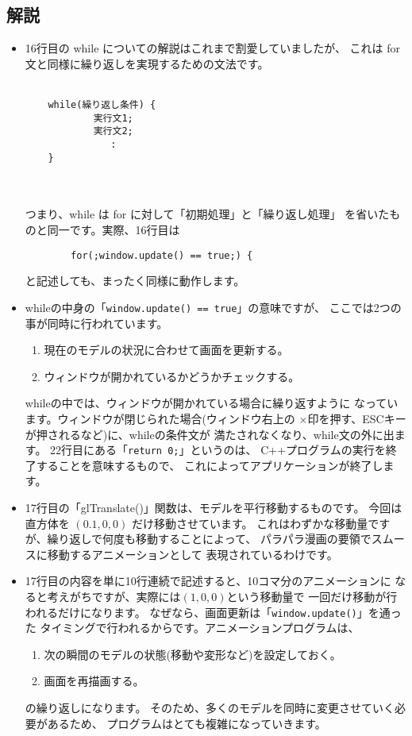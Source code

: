 \subsection*{解説}
\begin{itemize}
 \item 16行目の while についての解説はこれまで割愛していましたが、
	これは for 文と同様に繰り返しを実現するための文法です。\\ ~ \\
	\begin{shadebox}
	\begin{verbatim}
	while(繰り返し条件) {
	        実行文1;
	        実行文2;
	           :
	}
	\end{verbatim}
	\end{shadebox} \\ ~ \\
	つまり、while は for に対して「初期処理」と「繰り返し処理」
	を省いたものと同一です。実際、16行目は
	\begin{screen}
	\begin{verbatim}
	    for(;window.update() == true;) {
	\end{verbatim}
	\end{screen}
	と記述しても、まったく同様に動作します。

 \item whileの中身の「\verb+window.update() == true+」の意味ですが、
	ここでは2つの事が同時に行われています。
	\begin{enumerate}
	 \item 現在のモデルの状況に合わせて画面を更新する。
	 \item ウィンドウが開かれているかどうかチェックする。
	\end{enumerate}
	whileの中では、ウィンドウが開かれている場合に繰り返すように
	なっています。ウィンドウが閉じられた場合(ウィンドウ右上の
	×印を押す、ESCキーが押されるなど)に、whileの条件文が
	満たされなくなり、while文の外に出ます。
	22行目にある「\verb+return 0;+」というのは、
	C++プログラムの実行を終了することを意味するもので、
	これによってアプリケーションが終了します。

 \item 17行目の「glTranslate()」関数は、モデルを平行移動するものです。
	今回は直方体を \((0.1, 0, 0)\) だけ移動させています。
	これはわずかな移動量ですが、繰り返しで何度も移動することによって、
	パラパラ漫画の要領でスムースに移動するアニメーションとして
	表現されているわけです。

 \item 17行目の内容を単に10行連続で記述すると、10コマ分のアニメーションに
	なると考えがちですが、実際には\((1, 0, 0)\)という移動量で
	一回だけ移動が行われるだけになります。
	なぜなら、画面更新は「\verb+window.update()+」を通った
	タイミングで行われるからです。アニメーションプログラムは、
	\begin{enumerate}
	 \item 次の瞬間のモデルの状態(移動や変形など)を設定しておく。
	 \item 画面を再描画する。
	\end{enumerate}
	の繰り返しになります。
	そのため、多くのモデルを同時に変更させていく必要があるため、
	プログラムはとても複雑になっていきます。
\end{itemize}

